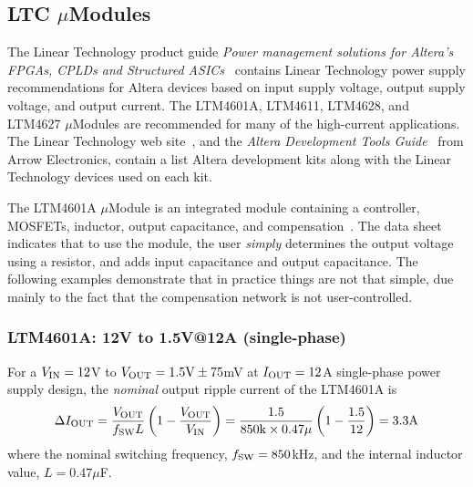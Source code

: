 \subsection{LTC $\mu$Modules}


The Linear Technology product guide {\em Power management solutions
for Altera's FPGAs, CPLDs and Structured 
ASICs}~\cite{Linear_Altera_Product_Guide_2012} contains
Linear Technology power supply recommendations for Altera devices
based on input supply voltage, output supply voltage, and output current.
The LTM4601A, LTM4611, LTM4628, and LTM4627 $\mu$Modules are recommended
for many of the high-current applications. 
%
The Linear Technology web site~\cite{Linear_Altera_Reference_Designs_2012}, and
the {\em Altera Development Tools Guide}~\cite{Arrow_Altera_Devtool_Guide_2010}
from Arrow Electronics, contain a list Altera development kits along with the
Linear Technology devices used on each kit.

The LTM4601A $\mu$Module is an integrated module containing a
controller, MOSFETs, inductor, output capacitance, and 
compensation~\cite{Linear_LTM4601A_2011}.
The data sheet indicates that to use the module, the user
{\em simply} determines the output voltage using a resistor, and
adds input capacitance and output capacitance. The following
examples demonstrate that in practice things are not that
simple, due mainly to the fact that the compensation network
is not user-controlled.

\subsubsection{LTM4601A: 12V to 1.5V@12A (single-phase)}

For a $V_{\rm IN} = 12$V to $V_{\rm OUT} = 1.5\text{V} \pm 75$mV at 
$I_{\rm OUT} = 12$A single-phase power supply design, the
{\em nominal} output ripple current of the LTM4601A is
%
\begin{equation}
\Delta I_{\rm OUT} = \frac{V_{\rm OUT}}{f_{\rm SW}L}\left(
1 - \frac{V_{\rm OUT}}{V_{\rm IN}}\right) =
\frac{1.5}{850\text{k}\times0.47\mu}\left(
1 - \frac{1.5}{12}\right) = 3.3\text{A}
\end{equation}
%
where the nominal switching frequency, $f_{\rm SW} = 850$kHz, and
the internal inductor value, $L = 0.47\mu$F.

